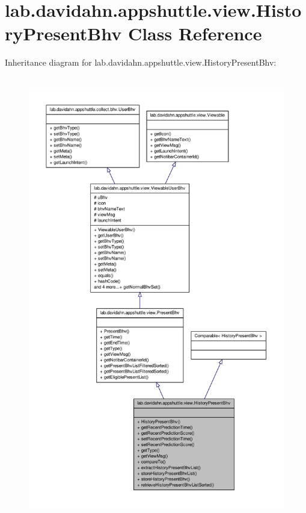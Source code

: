 \hypertarget{classlab_1_1davidahn_1_1appshuttle_1_1view_1_1_history_present_bhv}{\section{lab.\-davidahn.\-appshuttle.\-view.\-History\-Present\-Bhv \-Class \-Reference}
\label{classlab_1_1davidahn_1_1appshuttle_1_1view_1_1_history_present_bhv}
}


\-Inheritance diagram for lab.\-davidahn.\-appshuttle.\-view.\-History\-Present\-Bhv\-:
\nopagebreak
\begin{figure}[H]
\begin{center}
\leavevmode
\includegraphics[height=550pt]{classlab_1_1davidahn_1_1appshuttle_1_1view_1_1_history_present_bhv__inherit__graph}
\end{center}
\end{figure}


